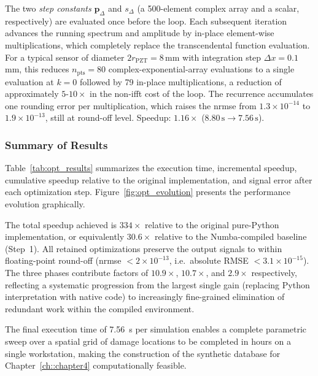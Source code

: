             The two \emph{step constants} $\mathbf{p}_\Delta$ and $s_\Delta$ (a 500-element complex array and a scalar, respectively) are evaluated once before the loop. Each subsequent iteration advances the running spectrum and amplitude by in-place element-wise multiplications, which completely replace the transcendental function evaluation. For a typical sensor of diameter $2r_\mathrm{PZT} = 8$\,mm with integration step $\Delta x = 0.1$\,mm, this reduces $n_\mathrm{pts} = 80$ complex-exponential-array evaluations to a single evaluation at $k = 0$ followed by 79 in-place multiplications, a reduction of approximately $5$-$10\times$ in the non-\acrshort{ifft} cost of the loop. The recurrence accumulates one rounding error per multiplication, which raises the \acrshort{nrmse} from $1.3\times10^{-14}$ to $1.9\times10^{-13}$, still at round-off level. Speedup: $1.16\times$ ($8.80\,\text{s} \to 7.56\,\text{s}$).

        \subsubsection{Summary of Results}
        \label{ssec:opt_summary}

            Table~\ref{tab:opt_results} summarizes the execution time, incremental speedup, cumulative speedup relative to the original implementation, and signal error after each optimization step. Figure~\ref{fig:opt_evolution} presents the performance evolution graphically.

            The total speedup achieved is $334\times$ relative to the original pure-Python implementation, or equivalently $30.6\times$ relative to the Numba-compiled baseline (Step~1).  All retained optimizations preserve the output signals to within floating-point round-off (\acrshort{nrmse} $< 2 \times 10^{-13}$, i.e.\ absolute RMSE $< 3.1\times10^{-15}$).  The three phases contribute factors of $10.9\times$, $10.7\times$, and $2.9\times$ respectively, reflecting a systematic progression from the largest single gain (replacing Python interpretation with native code) to increasingly fine-grained elimination of redundant work within the compiled environment.

            The final execution time of \SI{7.56}{\second} per simulation enables a complete parametric sweep over a spatial grid of damage locations to be completed in hours on a single workstation, making the construction of the synthetic database for Chapter~\ref{ch::chapter4} computationally feasible.


